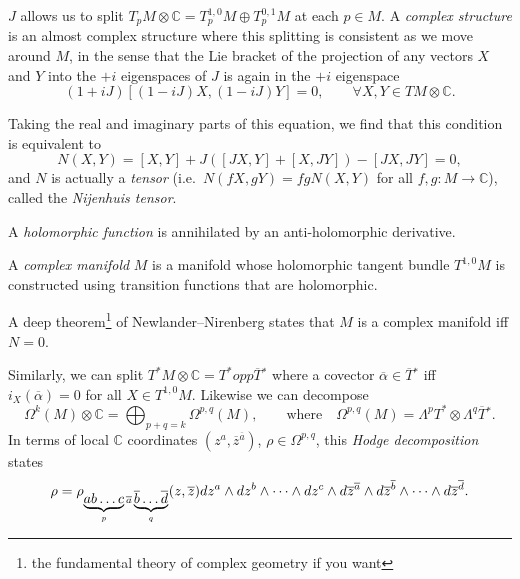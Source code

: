\begin{definition}
  $J$ allows us to split $T_p M \otimes \mathbb{C} = T_p^{1, 0} M \oplus T_p^{0,1} M$ at each $p \in M$.
  A \emph{complex structure} is an almost complex structure where this splitting is consistent as we move around $M$, in the sense that the Lie bracket of the projection of any vectors $X$ and $Y$ into the $+i$ eigenspaces of $J$ is again in the $+i$ eigenspace
  \begin{equation}
    (1 + i J)[(1- i J )X, (1 - i J) Y] = 0, \qquad \forall X, Y \in TM \otimes \mathbb{C}.
  \end{equation}
\end{definition}
Taking the real and imaginary parts of this equation, we find that this condition is equivalent to
\begin{equation}
  N(X, Y) = [X, Y] + J \left( [JX, Y] + [X, JY] \right) - [JX, JY] = 0,
\end{equation}
and $N$ is actually a \emph{tensor} (i.e.~$N(fX, gY) = f g N(X, Y)$ for all $f, g \colon M \to \mathbb{C}$), called the \emph{Nijenhuis tensor}.
\begin{definition}[holomorphic]
  A \emph{holomorphic function} is annihilated by an anti-holomorphic derivative.
\end{definition}
\begin{definition}
  A \emph{complex manifold} $M$ is a manifold whose holomorphic tangent bundle $T^{1, 0} M$ is constructed using transition functions that are holomorphic.
\end{definition}
A deep theorem\footnote{the fundamental theory of complex geometry if you want} of Newlander--Nirenberg states that $M$ is a complex manifold iff $N = 0$.

Similarly, we can split $T^* M \otimes \mathbb{C} = T^* opp \overline{T}{}^*$ where a covector $\overline{\alpha}{} \in \overline{T}{}^*$ iff $i_X (\overline{\alpha}{}) = 0$ for all $X \in T^{1, 0} M$.
Likewise we can decompose
\begin{equation}
  \Omega^k(M) \otimes \mathbb{C} = \bigoplus_{p + q = k} \Omega^{p, q}(M), \qquad \text{where} \quad \Omega^{p, q}(M) = \Lambda^p T^* \otimes \Lambda^q \overline{T}{}^*.
\end{equation}
In terms of local $\mathbb{C}$ coordinates $(z^{a}, \overline{z}{}^{\overline{a}{}})$, $\rho \in \Omega^{p, q}$, this \emph{Hodge decomposition} states
\begin{equation}
  \rho = \rho_{\underbrace{ab \dots c}_{\mathclap{p}} \overline{a}{} \underbrace{\overline{b}{} \dots \overline{d}{}}_{\mathclap{q}}}(z, \overline{z}{}) dz^a \wedge dz^b \wedge \dots \wedge dz^c \wedge d \overline{z}{}^{\overline{a}{}} \wedge d \overline{z}{} ^{\overline{b}{}} \wedge \dots \wedge d \overline{z}{} ^{\overline{d}{}}.
\end{equation}

